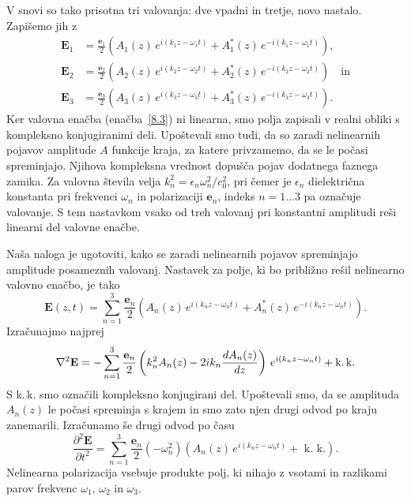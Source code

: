 V snovi so tako prisotna tri valovanja:
dve vpadni in tretje, novo nastalo. Zapišemo jih z 
\begin{align}
\mathbf{E}_{1} & =  \frac{\mathbf{e}_{1}}{2}\left(A_{1}(z)\, 
e^{i(k_{1}z-\omega_{1}t)}+A_{1}^{*}(z)\, e^{-i(k_{1}z-\omega_{1}t)}\right),\nonumber \\
\mathbf{E}_{2} & =  \frac{\mathbf{e}_{2}}{2}\left(A_{2}(z)\, 
e^{i(k_{2}z-\omega_{2}t)}+A_{2}^{*}(z)\, e^{-i(k_{2}z-\omega_{2}t)}\right) \quad \mathrm{in} \nonumber \\
\mathbf{E}_{3} & =  \frac{\mathbf{e}_{3}}{2}\left(A_{3}(z)\, 
e^{i(k_{3}z-\omega_{3}t)}+A_{3}^{*}(z)\, e^{-i(k_{3}z-\omega_{3}t)}\right).
\end{align}
Ker valovna enačba (enačba~\ref{8.3}) ni linearna, smo polja 
zapisali v realni obliki s kompleksno konjugiranimi
deli. Upoštevali smo tudi,
da so zaradi nelinearnih pojavov amplitude $A$ funkcije kraja, za
katere privzamemo, da se le počasi spreminjajo. Njihova kompleksna vrednost
dopušča pojav dodatnega faznega zamika. Za valovna
števila velja $k_{n}^{2}=\epsilon_{n}\omega_n^{2}/c_0^{2}$,
pri čemer je $\epsilon_{n}$ dielektrična konstanta pri frekvenci
$\omega_{n}$ in polarizaciji $\mathbf{e}_{n}$, indeks $n = 1...3$ pa označuje
valovanje. S tem nastavkom vsako od treh valovanj
pri konstantni amplitudi reši linearni del valovne enačbe. 

Naša naloga
je ugotoviti, kako se zaradi nelinearnih pojavov spreminjajo amplitude posameznih valovanj.
Nastavek za polje, ki bo približno rešil nelinearno valovno enačbo, je tako
\begin{equation}
\mathbf{E}(z,t) = \sum_{n=1}^3 \frac{\mathbf{e}_{n}}{2}\left(A_{n}(z)\, 
e^{i(k_{n}z-\omega_{n}t)}+A_{n}^{*}(z)\, e^{-i(k_{n}z-\omega_{n}t)}\right).
\label{eq:nlnastavek}
\end{equation}
Izračunajmo najprej 
\begin{equation}
\nabla^{2}\mathbf{E}=-\sum_{n=1}^3 \frac{\mathbf{e}_{n}}{2}\left(k_{n}^{2}A_{n}(z)-2ik_{n}
\frac{dA_{n}(z)}{dz}\right)\, e^{i(k_{n}z-\omega_{n}t)}+\mbox{k.\,k.}
\label{8.5}
\end{equation}
S k.\,k. smo označili kompleksno konjugirani del. Upoštevali smo,
da se amplituda $A_{n}(z)$ le počasi spreminja s krajem in smo zato njen
drugi odvod po kraju zanemarili.
Izračunamo še drugi odvod po času 
\begin{equation}
\frac{\partial^2\mathbf{E}}{\partial t^2}=\sum_{n=1}^3 \frac{\mathbf{e}_{n}}{2}
\left(-\omega_n^2\right) \left(A_{n}(z)\, e^{i(k_{n}z-\omega_{n}t)}+\mbox{ k. k.}\right).
\label{8.5a}
\end{equation}
Nelinearna polarizacija vsebuje produkte polj, ki nihajo z
vsotami in razlikami parov frekvenc $\omega_{1}$, $\omega_{2}$ in
$\omega_{3}$.

